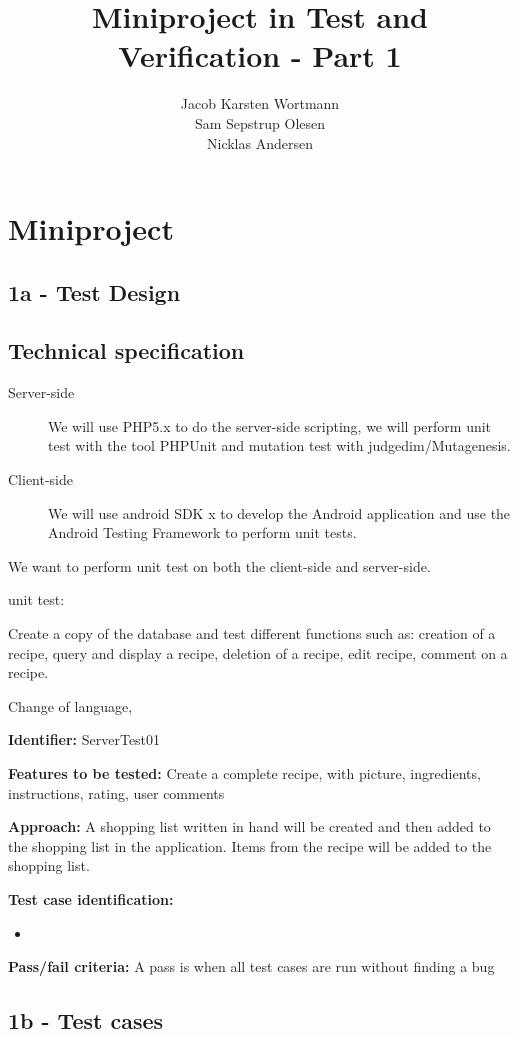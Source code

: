 \documentclass[a4paper,12pt]{memoir}
\title{Miniproject in Test and Verification - Part 1}
\author{Jacob Karsten Wortmann\\Sam Sepstrup Olesen\\Nicklas Andersen}
\newcommand{\testdesign}[5]
{
\begin{framed}
\begin{description}
\item \textbf{Identifier:} #1
\item \textbf{Features to be tested:} #2
\item \textbf{Approach:} #3
\item \textbf{Test case identification:} #4
\item \textbf{Pass/fail criteria:} #5
\end{description}
\end{framed}
}
\begin{document}
\maketitle
\chapter*{Miniproject}
\section*{1a - Test Design}
\section{Technical specification}
\begin{description}
    \item[Server-side]
        We will use PHP5.x to do the server-side scripting,
        we will perform unit test with the tool PHPUnit and mutation test with judgedim/Mutagenesis.
    \item[Client-side]
        We will use android SDK x to develop the Android application and use the Android Testing Framework to perform unit tests.
\end{description}

We want to perform unit test on both the client-side and server-side.

unit test:

Create a copy of the database and test different functions such as: creation of a recipe, query and display a recipe, deletion of a recipe, edit recipe, comment on a recipe.

Change of language, 


\testdesign
{ServerTest01}
{Create a complete recipe, with picture, ingredients, instructions, rating, user comments}
{A shopping list written in hand will be created and then added to the shopping list in the application. Items from the recipe will be added to the shopping list.}
{\begin{itemize}[nolistsep]
\item
\end{itemize}}
{A pass is when all test cases are run without finding a bug}




\section*{1b - Test cases}
\end{document}
